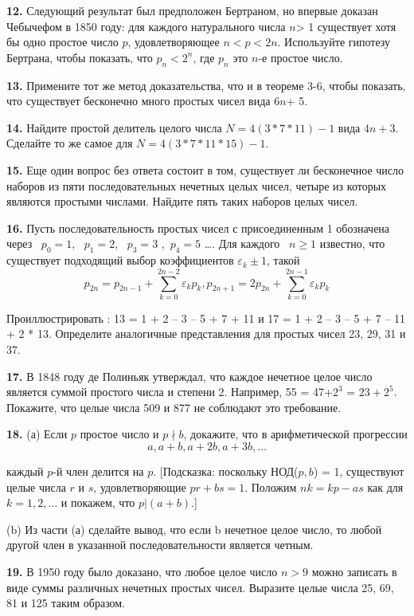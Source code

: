 \documentclass[11pt]{article}
\begin{document}
\textbf{12.}	Следующий результат был предположен Бертраном, но впервые доказан Чебычефом в 1850 году: для каждого натурального числа $n$> 1 существует хотя бы одно простое число $p$, удовлетворяющее $n<p<2n$. Используйте гипотезу Бертрана, чтобы показать, что $p_n<2^n$, где $p_n$ это $n$-е простое число.

\textbf{13.}	Примените тот же метод доказательства, что и в теореме 3-6, чтобы показать, что существует бесконечно много простых чисел вида 6$n$+ 5.

\textbf{14.	}Найдите простой делитель целого числа $N= 4 (3 *  7 *  11) - 1$ вида $4n + 3$. Сделайте то же самое для $N = 4(3 * 7 *  11 *  15) - 1$.

\textbf{15.}	Еще один вопрос без ответа состоит в том, существует ли бесконечное число наборов из пяти последовательных нечетных целых чисел, четыре из которых являются простыми числами. Найдите пять таких наборов целых чисел.

\textbf{16.}	Пусть последовательность простых чисел с присоединенным 1 обозначена через ~$p_0= 1$, ~$p_1 = 2$, ~$p_3= 3$ ,~$p_4= 5$ \ldots . Для каждого ~$n\geq 1$ известно, что существует подходящий выбор коэффициентов $\varepsilon_k \pm 1$, такой
\[
p_{2n}=p_{2n-1}+\sum_{k=0}^{2n-2} \varepsilon_kp_k, p_{2n+1}=2p_{2n}+\sum_{k=0}^{2n-1} \varepsilon_kp_k
\]
 
Проиллюстрировать :
13 = 1 + 2 – 3 – 5 + 7 + 11     и     17 = 1 + 2 – 3 – 5 + 7 – 11 + 2 * 13.
Определите аналогичные представления для простых чисел 23, 29, 31 и 37.

\textbf{17.}	В 1848 году де Полиньяк утверждал, что каждое нечетное целое число является суммой простого числа и степени 2. Например, 55 = 47+$2^3$ = $23+2^5$. Покажите, что целые числа 509 и 877 не соблюдают это требование.

\textbf{18.}	(а) Если $p$ простое число и $p\nmid b$, докажите, что в арифметической прогрессии
\[
a,a+b,a+2b,a+3b,\ldots
\]
 
каждый $p$-й член делится на $p$. [Подсказка: поскольку НОД($p, b$) = 1, существуют    целые числа $r$ и $s$, удовлетворяющие $pr + bs = 1$. Положим $nk= kp - as$ как для $k = 1, 2, \ldots$ и покажем, что $p| (a+b)$.]

\qquad(b) Из части (а) сделайте вывод, что если b нечетное целое число, то любой другой член в указанной последовательности является четным.

\textbf{19.}	В 1950 году было доказано, что любое целое число $n > 9$ можно записать в виде суммы различных нечетных простых чисел. Выразите целые числа 25, 69, 81 и 125 таким образом.
\end{document}
